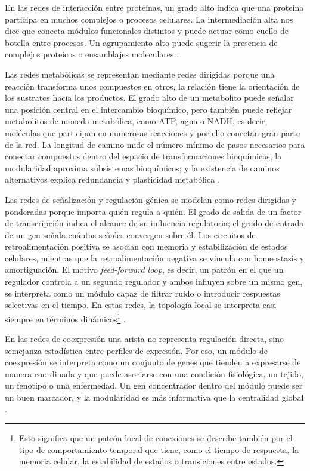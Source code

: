 \documentclass[11pt]{article}
\begin{document}
En las redes de interacción entre proteínas, un grado alto indica que una proteína participa en muchos complejos o procesos celulares. La intermediación alta nos dice que conecta módulos funcionales distintos y puede actuar como cuello de botella entre procesos. Un agrupamiento alto puede sugerir la presencia de complejos proteicos o ensamblajes moleculares \parencite{Koutrouli2020,Jeong2001,Joy2005}.

Las redes metabólicas se representan mediante redes dirigidas porque una reacción transforma unos compuestos en otros, la relación tiene la orientación de los sustratos hacia los productos. El grado alto de un metabolito puede señalar una posición central en el intercambio bioquímico, pero también puede reflejar metabolitos de moneda metabólica, como ATP, agua o NADH, es decir, moléculas que participan en numerosas reacciones y por ello conectan gran parte de la red. La longitud de camino mide el número mínimo de pasos necesarios para conectar compuestos dentro del espacio de transformaciones bioquímicas; la modularidad aproxima subsistemas bioquímicos; y la existencia de caminos alternativos explica redundancia y plasticidad metabólica \parencite{EmmertStreib2015,Koutrouli2020}.

Las redes de señalización y regulación génica se modelan como redes dirigidas y ponderadas porque importa quién regula a quién. El grado de salida de un factor de transcripción indica el alcance de su influencia regulatoria; el grado de entrada de un gen señala cuántas señales convergen sobre él. Los circuitos de retroalimentación positiva se asocian con memoria y estabilización de estados celulares, mientras que la retroalimentación negativa se vincula con homeostasis y amortiguación. El motivo \textit{feed-forward loop}, es decir, un patrón en el que un regulador controla a un segundo regulador y ambos influyen sobre un mismo gen, se interpreta como un módulo capaz de filtrar ruido o introducir respuestas selectivas en el tiempo. En estas redes, la topología local se interpreta casi siempre en términos dinámicos\footnote{Esto significa que un patrón local de conexiones se describe también por el tipo de comportamiento temporal que tiene, como el tiempo de respuesta, la memoria celular, la estabilidad de estados o transiciones entre estados.} 
\parencite{BanfRhee2017, EmmertStreib2014}. 

En las redes de coexpresión una arista no representa regulación directa, sino semejanza estadística entre perfiles de expresión. Por eso, un módulo de coexpresión se interpreta como un conjunto de genes que tienden a expresarse de manera coordinada y que puede asociarse con una condición fisiológica, un tejido, un fenotipo o una enfermedad. Un gen concentrador dentro del módulo puede ser un buen marcador, y la modularidad es más informativa que la centralidad global \parencite{Gnanakkumaar2019,Zheng2021,ZhangHorvath2005}.
\end{document}
